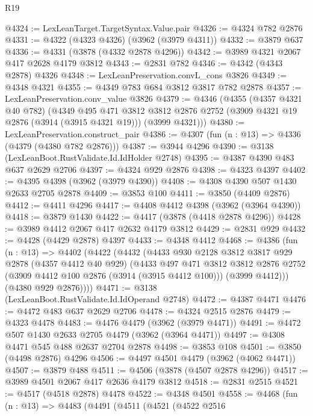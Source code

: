 \begin{lexlean}{R19}
\begin{coremodule}
@4324 := LexLeanTarget.TargetSyntax.Value.pair
@4326 := @4324 @782 @2876
@4331 := @4322 (@4323 @4326) (@3962 (@3979 @4311))
@4332 := @3879 @637
@4336 := @4331 (@3878 (@4332 @2878 @4296))
@4342 := @3989 @4321 @2067 @417 @2628 @4179 @3812
@4343 := @2831 @782
@4346 := @4342 (@4343 @2878) @4326
@4348 := LexLeanPreservation.convL_cons @3826
@4349 := @4348 @4321
@4355 := @4349 @783 @684 @3812 @3817 @782 @2878
@4357 := LexLeanPreservation.conv_value @3826
@4379 := @4346
    (@4355
      (@4357 @4321 @40 @782)
      (@4349
        @495
        @471
        @3812
        @3812
        @2876
        @2752
        (@3909 @4321 @19 @2876 (@3914 (@3915 @4321 @19)))
        (@3999 @4321)))
@4380 := LexLeanPreservation.construct_pair
@4386 := @4307 (fun (n : @13) => @4336 (@4379 (@4380 @782 @2876)))
@4387 := @3944 @4296
@4390 := @3138 (LexLeanBoot.RustValidate.Id.IdHolder @2748)
@4395 := @4387 @4390 @483 @637 @2629 @2706
@4397 := @4324 @929 @2876
@4398 := @4323 @4397
@4402 := @4395 @4398 (@3962 (@3979 @4390))
@4408 := @4308 @4390 @507 @1430 @2633 @2705 @2878
@4409 := @3853 @100
@4411 := @3850 (@4409 @2876)
@4412 := @4411 @4296
@4417 := @4408 @4412 @4398 (@3962 (@3964 @4390))
@4418 := @3879 @1430
@4422 := @4417 (@3878 (@4418 @2878 @4296))
@4428 := @3989 @4412 @2067 @417 @2632 @4179 @3812
@4429 := @2831 @929
@4432 := @4428 (@4429 @2878) @4397
@4433 := @4348 @4412
@4468 := @4386
    (fun (n : @13) =>
    @4402
      (@4422
        (@4432
          (@4433
            @930
            @2128
            @3812
            @3817
            @929
            @2878
            (@4357 @4412 @40 @929)
            (@4433
              @497
              @471
              @3812
              @3812
              @2876
              @2752
              (@3909 @4412 @100 @2876 (@3914 (@3915 @4412 @100)))
              (@3999 @4412)))
          (@4380 @929 @2876))))
@4471 := @3138 (LexLeanBoot.RustValidate.Id.IdOperand @2748)
@4472 := @4387 @4471
@4476 := @4472 @483 @637 @2629 @2706
@4478 := @4324 @2515 @2876
@4479 := @4323 @4478
@4483 := @4476 @4479 (@3962 (@3979 @4471))
@4491 := @4472 @507 @1430 @2633 @2705 @4479 (@3962 (@3964 @4471))
@4497 := @4308 @4471 @545 @488 @2637 @2704 @2878
@4498 := @3853 @108
@4501 := @3850 (@4498 @2876) @4296
@4506 := @4497 @4501 @4479 (@3962 (@4062 @4471))
@4507 := @3879 @488
@4511 := @4506 (@3878 (@4507 @2878 @4296))
@4517 := @3989 @4501 @2067 @417 @2636 @4179 @3812
@4518 := @2831 @2515
@4521 := @4517 (@4518 @2878) @4478
@4522 := @4348 @4501
@4558 := @4468
    (fun (n : @13) =>
    @4483
      (@4491
        (@4511
          (@4521
            (@4522
              @2516

\end{coremodule}
\end{lexlean}
